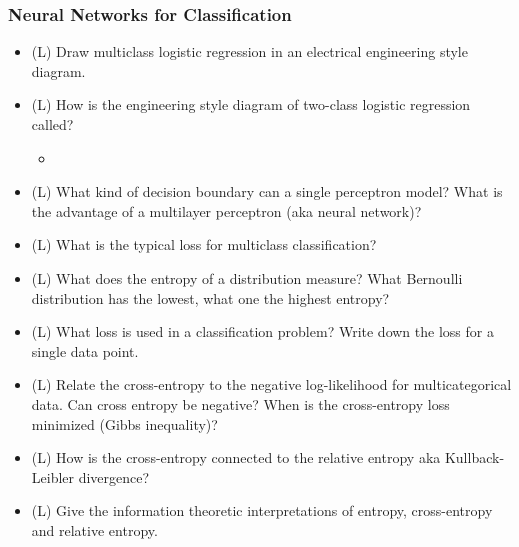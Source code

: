 \subsubsection*{Neural Networks for Classification}

\begin{itemize}
    \item (L) Draw multiclass logistic regression in an electrical engineering style diagram.
    \answerboxM
    \item (L) How is the engineering style diagram of two-class logistic regression called?
    \begin{itemize}
        \item {}
    \end{itemize}
    \answerboxM
    \item (L) What kind of decision boundary can a single perceptron model? What is the advantage
    of a multilayer perceptron (aka neural network)?
    \answerboxM
    \item (L) What is the typical loss for multiclass classification?
    \answerboxM
    \item (L) What does the entropy of a distribution measure? What Bernoulli distribution has the lowest, what one the highest entropy?
    \answerboxM
    \item (L) What loss is used in a classification problem? Write down the loss for a single data point.
    \answerboxM
    \item (L) Relate the cross-entropy to the negative log-likelihood for multicategorical data. Can cross entropy be negative? When is the 
    cross-entropy loss minimized (Gibbs inequality)?
    \answerboxM
    \item (L) How is the cross-entropy connected to the relative entropy aka Kullback-Leibler divergence?
    \answerboxM
    \item (L) Give the information theoretic interpretations of entropy, cross-entropy and relative entropy.
    \answerboxL
\end{itemize}

